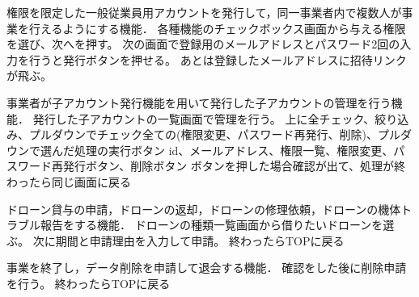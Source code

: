 \documentclass[a4paper, titlepage]{jsarticle}
\begin{document}
\begin{description}[labelwidth=\linewidth]
  \item [子アカウント発行機能] 権限を限定した一般従業員用アカウントを発行して，同一事業者内で複数人が事業を行えるようにする機能．
  各種機能のチェックボックス画面から与える権限を選び、次へを押す。
  次の画面で登録用のメールアドレスとパスワード2回の入力を行うと発行ボタンを押せる。
  あとは登録したメールアドレスに招待リンクが飛ぶ。

  \item [子アカウント管理機能] 事業者が子アカウント発行機能を用いて発行した子アカウントの管理を行う機能．
  発行した子アカウントの一覧画面で管理を行う。
  上に全チェック、絞り込み、プルダウンでチェック全ての(権限変更、パスワード再発行、削除)、プルダウンで選んだ処理の実行ボタン
  id、メールアドレス、権限一覧、権限変更、パスワード再発行ボタン、削除ボタン
  ボタンを押した場合確認が出て、処理が終わったら同じ画面に戻る

  \item [ドローン貸与申請機能] ドローン貸与の申請，ドローンの返却，ドローンの修理依頼，ドローンの機体トラブル報告をする機能．
  ドローンの種類一覧画面から借りたいドローンを選ぶ。
  次に期間と申請理由を入力して申請。
  終わったらTOPに戻る

  \item [退会機能] 事業を終了し，データ削除を申請して退会する機能．
  確認をした後に削除申請を行う。
  終わったらTOPに戻る
\end{description}
\end{document}
